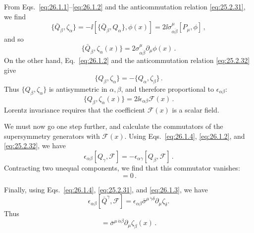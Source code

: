 From Eqs.~\eqref{eq:26.1.1}--\eqref{eq:26.1.2} and the anticommutation
relation \eqref{eq:25.2.31}, we find
\[
  \{\bar Q_{\dot\beta},\zeta_\alpha\}
  =-\ii[\{\bar Q_{\dot\beta},Q_\alpha\},\phi(x)]
  =2\ii\sigma^\mu_{\alpha\dot\beta}[P_\mu,\phi]\,,
\]
and so
\begin{equation}
  \{\bar Q_{\dot\beta},\zeta_\alpha(x)\}
  =2\sigma^\mu_{\alpha\dot\beta}\partial_\mu\phi(x)\,.
  \tag{26.1.3}\label{eq:26.1.3}
\end{equation}
On the other hand, Eq.~\eqref{eq:26.1.2} and the anticommutation relation
\eqref{eq:25.2.32} give
\[
  \{Q_\beta,\zeta_\alpha\}
  =-\{Q_\alpha,\zeta_\beta\}\,.
\]
Thus \(\{Q_\beta,\zeta_\alpha\}\) is antisymmetric in
\(\alpha,\beta\), and
therefore proportional to \(\epsilon_{\alpha\beta}\):
\begin{equation}
  \{Q_\beta,\zeta_\alpha(x)\}
  =2\ii\epsilon_{\alpha\beta}\mathcal{F}(x)\,.
  \tag{26.1.4}\label{eq:26.1.4}
\end{equation}
Lorentz invariance requires that the coefficient \(\mathcal{F}(x)\) is a
scalar field.

We must now go one step further, and calculate the commutators of the
supersymmetry generators with \(\mathcal{F}(x)\). Using
Eqs.~\eqref{eq:26.1.4}, \eqref{eq:26.1.2}, and \eqref{eq:25.2.32}, we have
\[
  \epsilon_{\alpha\beta}[Q_\gamma,\mathcal F]
  =-\epsilon_{\alpha\gamma}[Q_\beta,\mathcal F]\,.
\]
Contracting two unequal components, we find that this commutator vanishes:
\begin{equation}
  [Q_\alpha,\mathcal{F}(x)]=0\,.
  \tag{26.1.5}\label{eq:26.1.5}
\end{equation}

Finally, using Eqs.~\eqref{eq:26.1.4}, \eqref{eq:25.2.31}, and
\eqref{eq:26.1.3}, we have
\[
  \epsilon_{\alpha\beta}[\bar Q^{\dot\gamma},\mathcal F]
  =\epsilon_{\alpha\beta}
    \bar\sigma^{\mu\,\dot\gamma\delta}\partial_\mu\zeta_\delta .
\]
Thus
\begin{equation}
  [\bar Q^{\dot\alpha},\mathcal{F}(x)]
  =\bar\sigma^{\mu\,\dot\alpha\beta}
    \partial_\mu\zeta_\beta(x)\,.
  \tag{26.1.6}\label{eq:26.1.6}
\end{equation}

